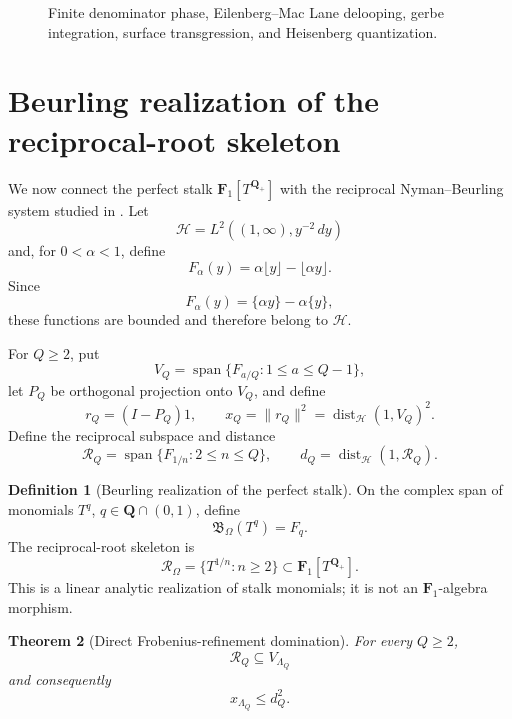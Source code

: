 \documentclass[11pt]{amsart}
\numberwithin{equation}{section}
\newtheorem{theorem}{Theorem}[section]
\theoremstyle{definition}
\newtheorem{definition}[theorem]{Definition}
\newcommand{\Z}{\mathbf Z}
\newcommand{\Q}{\mathbf Q}
\newcommand{\C}{\mathbf C}
\newcommand{\Fone}{\mathbf F_1}
\newcommand{\cH}{\mathcal H}
\newcommand{\cR}{\mathcal R}
\newcommand{\End}{\operatorname{End}}
\begin{document}
\begin{figure}[htbp]
\centering
{}
\caption{Finite denominator phase, Eilenberg--Mac Lane delooping,
gerbe integration, surface transgression, and Heisenberg quantization.}
\label{fig:phase-gerbe-quantization}
\end{figure}

\section{Beurling realization of the reciprocal-root skeleton}
\label{sec:beurling-realization}

We now connect the perfect stalk $\Fone[T^{\Q_+}]$ with the reciprocal
Nyman--Beurling system studied in \cite{Schultze}.  Let
\[
\cH=L^2((1,\infty),y^{-2}\,dy)
\]
and, for $0<\alpha<1$, define
\[
F_\alpha(y)=\alpha\lfloor y\rfloor-\lfloor\alpha y\rfloor.
\]
Since
\[
F_\alpha(y)=\{\alpha y\}-\alpha\{y\},
\]
these functions are bounded and therefore belong to $\cH$.

For $Q\geq2$, put
\[
V_Q=\operatorname{span}\{F_{a/Q}:1\leq a\leq Q-1\},
\]
let $P_Q$ be orthogonal projection onto $V_Q$, and define
\[
r_Q=(I-P_Q)1,
\qquad
x_Q=\|r_Q\|^2
=\operatorname{dist}_{\cH}(1,V_Q)^2.
\]
Define the reciprocal subspace and distance
\[
\cR_Q=\operatorname{span}\{F_{1/n}:2\leq n\leq Q\},
\qquad
 d_Q=\operatorname{dist}_{\cH}(1,\cR_Q).
\]

\begin{definition}[Beurling realization of the perfect stalk]
\label{def:beurling-realization}
On the complex span of monomials $T^q$, $q\in\Q\cap(0,1)$, define
\[
\mathfrak B_\Omega(T^q)=F_q.
\]
The reciprocal-root skeleton is
\[
\mathscr R_\Omega=\{T^{1/n}:n\geq2\}
\subset\Fone[T^{\Q_+}].
\]
This is a linear analytic realization of stalk monomials; it is not an
$\Fone$-algebra morphism.
\end{definition}

\begin{theorem}[Direct Frobenius-refinement domination]
\label{thm:direct-beurling-domination}
For every $Q\geq2$,
\[
\cR_Q\subseteq V_{\Lambda_Q}
\]
and consequently
\[
\boxed{x_{\Lambda_Q}\leq d_Q^2.}
\]
\end{theorem}
\end{document}
